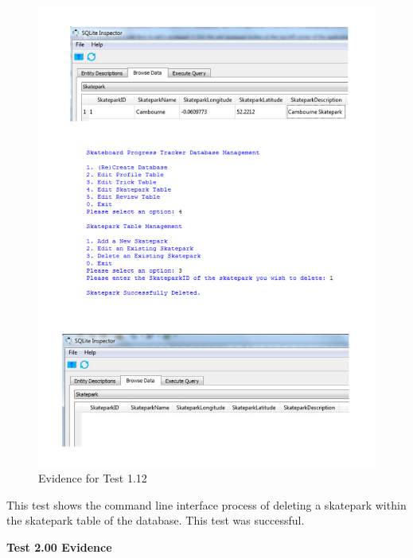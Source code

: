 \begin{figure}[H]
    \includegraphics[width=\textwidth]{./Testing/AnnotatedSamples/Test112.pdf}
    \caption{Evidence for Test 1.12} \label{fig:Test 1.12}
\end{figure}

This test shows the command line interface process of deleting a skatepark within the skatepark table of the database. This test was successful.

\textbf{Test 2.00 Evidence}

